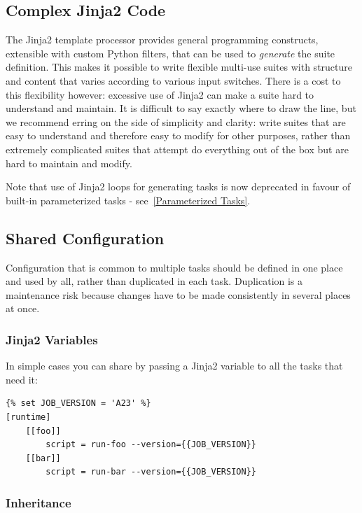 \subsection{Complex Jinja2 Code}

The Jinja2 template processor provides general programming constructs,
extensible with custom Python filters, that can be used to {\em generate} the
suite definition. This makes it possible to write flexible multi-use
suites with structure and content that varies according to various input
switches. There is a cost to this flexibility however: excessive use of Jinja2
can make a suite hard to understand and maintain. It is difficult to say
exactly where to draw the line, but we recommend erring on the side of
simplicity and clarity: write suites that are easy to understand and therefore
easy to modify for other purposes, rather than extremely complicated suites
that attempt do everything out of the box but are hard to maintain and modify.

Note that use of Jinja2 loops for generating tasks is now deprecated in favour
of built-in parameterized tasks - see~\ref{Parameterized Tasks}.

\subsection{Shared Configuration}

Configuration that is common to multiple tasks should be defined in one
place and used by all, rather than duplicated in each task. Duplication is
a maintenance risk because changes have to be made consistently in several
places at once.

\subsubsection{Jinja2 Variables}

In simple cases you can share by passing a Jinja2 variable to all the tasks
that need it:

\lstset{language=suiterc}
\begin{lstlisting}
{% set JOB_VERSION = 'A23' %}
[runtime]
    [[foo]]
        script = run-foo --version={{JOB_VERSION}}
    [[bar]]
        script = run-bar --version={{JOB_VERSION}}
\end{lstlisting}

\subsubsection{Inheritance}

